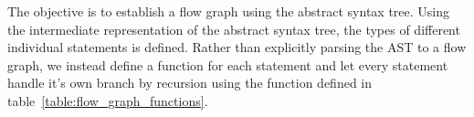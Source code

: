 The objective is to establish a flow graph using the abstract syntax tree. Using the intermediate representation of the abstract syntax tree, the types of different individual statements is defined. Rather than explicitly parsing the AST to a flow graph, we instead define a function for each statement and let every statement handle it's own branch by recursion using the function defined in table~\ref{table:flow_graph_functions}.

\begin{table}
\end{table}
